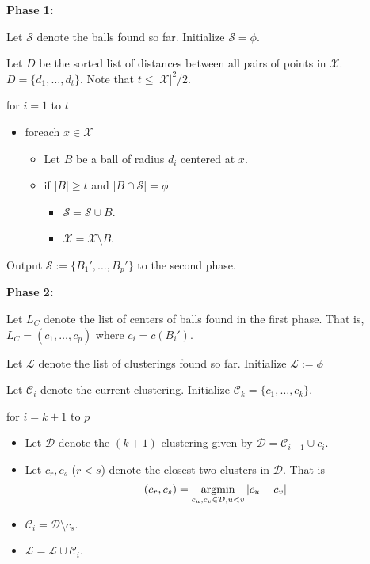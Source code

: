 \documentclass[11pt]{article}
\newcommand{\mc}{\mathcal}
\newenvironment{alg}{
    \begin{list}{}{
        \setlength{\itemsep}{2pt}
        \setlength{\parsep}{0pt}
        \setlength{\parskip}{0pt}
        \setlength{\topsep}{1pt}
    }
}
{
    \end{list}
}
\begin{document}
\begin{algorithm}
\begin{alg}
\item[] \textbf{Phase 1:}
\item[] Let $\mc S$ denote the balls found so far. Initialize $\mc S = \phi$.
\item[] Let $D$ be the sorted list of distances between all pairs of points in $\mc X$. $D = \{d_1,\ldots,d_t\}$. Note that $t \le |\mc X|^2/2$.
\item[] for $i=1$ to $t$
\begin{itemize}
\item[] foreach $x \in \mc X$
\begin{itemize}
\item[] Let $B$ be a ball of radius $d_i$ centered at $x$.
\item[] if $|B| \ge t$ and $|B \cap \mathcal{S} | = \phi$
\begin{itemize}
\item[] $\mathcal{S} = \mathcal{S} \cup B$. 
\item[] $\mc X = \mc X\setminus B$.
\end{itemize}
\end{itemize}
\end{itemize}
\item[] Output $\mc S := \{B_1',\ldots,B_p'\}$ to the second phase.

\item[] \textbf{Phase 2:}
\item[] Let $L_C$ denote the list of centers of balls found in the first phase. That is, $L_C = (c_1,\ldots,c_p)$ where $c_i = c(B_i')$.
\item[] Let $\mc L$ denote the list of clusterings found so far. Initialize $\mc L := \phi$
\item[] Let $\mc C_i$ denote the current clustering. Initialize $\mc C_k = \{c_1,\ldots,c_k\}$.
\item[] for $i=k+1$ to $p$
\begin{itemize}
\item[] Let $\mc D$ denote the $(k+1)$-clustering given by $\mc D = \mc C_{i-1} \cup c_i$. 
\item[] Let $c_r, c_s$ ($r < s$) denote the closest two clusters in $\mc D$. That is $$(c_r, c_s) = \argmin_{c_u,c_v \in \mc D, u < v} |c_u -c_v|$$
\item[] $\mc C_i = \mc D \setminus c_s$.
\item[] $\mc L = \mc L \cup \mc C_i$.


\end{itemize}
\end{alg}
\end{algorithm}
\end{document}
